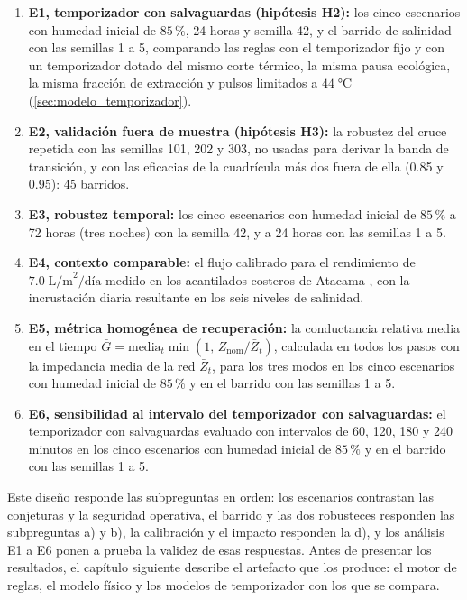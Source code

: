 \begin{enumerate}[leftmargin=*]
  \item \textbf{E1, temporizador con salvaguardas (hip\'otesis H2):} los cinco escenarios con humedad inicial de $85\,\%$, 24 horas y semilla 42, y el barrido de salinidad con las semillas 1 a 5, comparando las reglas con el temporizador fijo y con un temporizador dotado del mismo corte t\'ermico, la misma pausa ecol\'ogica, la misma fracci\'on de extracci\'on y pulsos limitados a $44\;\si{\celsius}$ (\cref{sec:modelo_temporizador}).
  \item \textbf{E2, validaci\'on fuera de muestra (hip\'otesis H3):} la robustez del cruce repetida con las semillas 101, 202 y 303, no usadas para derivar la banda de transici\'on, y con las eficacias de la cuadr\'icula m\'as dos fuera de ella (0.85 y 0.95): 45 barridos.
  \item \textbf{E3, robustez temporal:} los cinco escenarios con humedad inicial de $85\,\%$ a 72 horas (tres noches) con la semilla 42, y a 24 horas con las semillas 1 a 5.
  \item \textbf{E4, contexto comparable:} el flujo calibrado para el rendimiento de $7.0\;\text{L/m}^2\text{/d\'ia}$ medido en los acantilados costeros de Atacama \parencite{cereceda2008spatial}, con la incrustaci\'on diaria resultante en los seis niveles de salinidad.
  \item \textbf{E5, m\'etrica homog\'enea de recuperaci\'on:} la conductancia relativa media en el tiempo $\bar{G} = \text{media}_t\min(1,\,Z_{\text{nom}}/\bar{Z}_t)$, calculada en todos los pasos con la impedancia media de la red $\bar{Z}_t$, para los tres modos en los cinco escenarios con humedad inicial de $85\,\%$ y en el barrido con las semillas 1 a 5.
  \item \textbf{E6, sensibilidad al intervalo del temporizador con salvaguardas:} el temporizador con salvaguardas evaluado con intervalos de 60, 120, 180 y 240 minutos en los cinco escenarios con humedad inicial de $85\,\%$ y en el barrido con las semillas 1 a 5.
\end{enumerate}

Este dise\~no responde las subpreguntas en orden: los escenarios contrastan las conjeturas y la seguridad operativa, el barrido y las dos robusteces responden las subpreguntas a) y b), la calibraci\'on y el impacto responden la d), y los an\'alisis E1 a E6 ponen a prueba la validez de esas respuestas. Antes de presentar los resultados, el cap\'itulo siguiente describe el artefacto que los produce: el motor de reglas, el modelo f\'isico y los modelos de temporizador con los que se compara.

